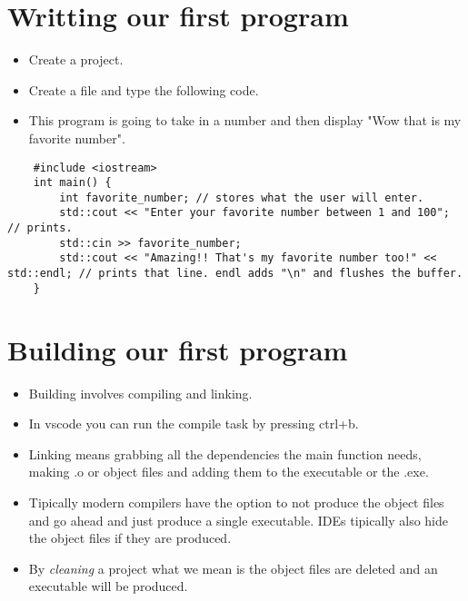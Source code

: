 
\section{Writting our first program}
\begin{itemize}
    \item Create a project.
    \item Create a file and type the following code. 
    \item This program is going to take in a number and then display "Wow that is my favorite number".
\end{itemize} 
\begin{verbatim}
    #include <iostream>
    int main() {
        int favorite_number; // stores what the user will enter.
        std::cout << "Enter your favorite number between 1 and 100"; // prints.
        std::cin >> favorite_number;
        std::cout << "Amazing!! That's my favorite number too!" << std::endl; // prints that line. endl adds "\n" and flushes the buffer.
    }
\end{verbatim}


\section{Building our first program}
\begin{itemize}
    \item Building involves compiling and linking.
    \item In vscode you can run the compile task by pressing ctrl+b.
    \item Linking means grabbing all the dependencies the main function needs, making .o or object files and adding them to the executable or the .exe.
    \item Tipically modern compilers have the option to not produce the object files and go ahead and just produce a single executable. IDEs tipically also hide the object files if they are produced.
    \item By \emph{cleaning} a project what we mean is the object files are deleted and an executable will be produced.
\end{itemize}

